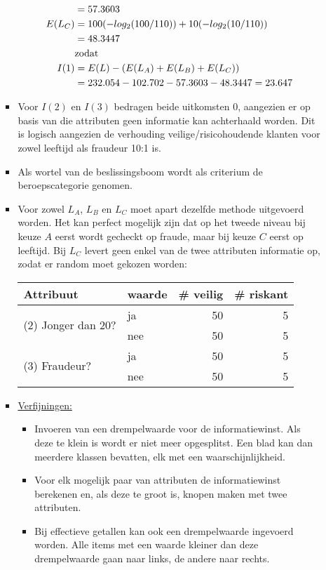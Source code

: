 \begin{itemize}
\begin{itemize}
\begin{itemize}
\begin{equation*}
\begin{split}
							     		&  = 57.3603 \\
							     E(L_C) & = 100(-log_2(100/110)) + 10(-log_2(10/110)) \\
									     & = 48.3447\\ 
									     & \hbox{zodat} \\
							I(1) & =  E(L) - (E(L_A) + E(L_B) + E(L_C)) \\
							 	 & = 232.054 - 102.702 - 57.3603 - 48.3447 = 23.647							         	     
						\end{split}
					\end{equation*}
					\item Voor $I(2)$ en $I(3)$ bedragen beide uitkomsten $0$, aangezien er op basis van die attributen geen informatie kan achterhaald worden. Dit is logisch aangezien de verhouding veilige/risicohoudende klanten voor zowel leeftijd als fraudeur 10:1 is.
					\item Als wortel van de beslissingsboom wordt als criterium de beroepscategorie genomen.
					\item Voor zowel $L_A$, $L_B$ en $L_C$ moet apart dezelfde methode uitgevoerd worden. Het kan perfect mogelijk zijn dat op het tweede niveau bij keuze $A$ eerst wordt gecheckt op fraude, maar bij keuze $C$ eerst op leeftijd. 
					\alert Bij $L_C$ levert geen enkel van de twee attributen informatie op, zodat er random moet gekozen worden:
					\begin{table}[ht]
						\centering
						\begin{tabular}{|l | l |rr|}
							\hline	
							Attribuut & waarde & \# veilig & \# riskant \\
							\hline	
							\multirow{2}{*}{(2) Jonger dan 20?} & ja & 50 & 5 \\
							& nee & 50 & 5 \\
							\hline	
							\multirow{2}{*}{(3) Fraudeur?} & ja & 50 & 5 \\
							& nee & 50 & 5 \\
							\hline			
						\end{tabular}
					\end{table}
					\item \underline{Verfijningen:}
					\begin{itemize}
						\item Invoeren van een drempelwaarde voor de informatiewinst. Als deze te klein is wordt er niet meer opgesplitst. Een blad kan dan meerdere klassen bevatten, elk met een waarschijnlijkheid.
						\item Voor elk mogelijk paar van attributen de informatiewinst berekenen en, als deze te groot is, knopen maken met twee attributen.
						\item Bij effectieve getallen kan ook een drempelwaarde ingevoerd worden. Alle items met een waarde kleiner dan deze drempelwaarde gaan naar links, de andere naar rechts.
					\end{itemize}
				\end{itemize}
			\end{itemize}
			
		\end{itemize}

